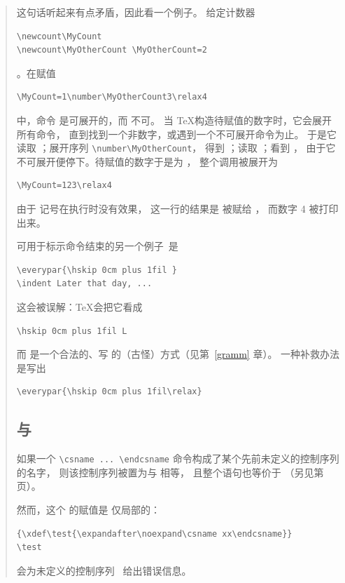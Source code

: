 \documentclass[a4paper]{rapport3}
\newenvironment{disp}{\begin{quotation}}{\end{quotation}}
\begin{document}
\begin{disp}
这句话听起来有点矛盾，因此看一个例子。
给定计数器 \begin{verbatim}
\newcount\MyCount
\newcount\MyOtherCount \MyOtherCount=2
\end{verbatim}
。在赋值 \begin{verbatim}
\MyCount=1\number\MyOtherCount3\relax4
\end{verbatim}
中，命令  是可展开的，而  不可。
当 \TeX 构造待赋值的数字时，它会展开所有命令，
直到找到一个非数字，或遇到一个不可展开命令为止。
于是它读取 ；展开序列 \verb>\number\MyOtherCount>，
得到 ；读取 ；看到 ，
由于它不可展开便停下。待赋值的数字于是为 ，
整个调用被展开为
\begin{verbatim}
\MyCount=123\relax4
\end{verbatim}
由于  记号在执行时没有效果，
这一行的结果是  被赋给 ，
而数字 4 被打印出来。

 可用于标示命令结束的另一个例子\label{fil:l:l}\ 是
\begin{verbatim}
\everypar{\hskip 0cm plus 1fil }
\indent Later that day, ... 
\end{verbatim}
这会被误解：\TeX 会把它看成
\begin{verbatim}
\hskip 0cm plus 1fil L
\end{verbatim}
而 \hbox{} 是一个合法的、写  的（古怪）方式（见第~\ref{gramm} 章）。
一种补救办法是写出
\begin{verbatim}
\everypar{\hskip 0cm plus 1fil\relax}
\end{verbatim}

\subsection{ 与 }
\label{relax:cs}

如果一个 \verb-\csname ... \endcsname- 命令构成了某个先前未定义的控制序列的名字，
则该控制序列被置为与  相等，
且整个语句也等价于 
（另见第~\pageref{cs:name} 页）。

然而，这个  的赋值是
\altt
仅局部的：
\begin{verbatim}
{\xdef\test{\expandafter\noexpand\csname xx\endcsname}}
\test
\end{verbatim}
会为未定义的控制序列~
给出错误信息。


\end{disp}
\end{document}
